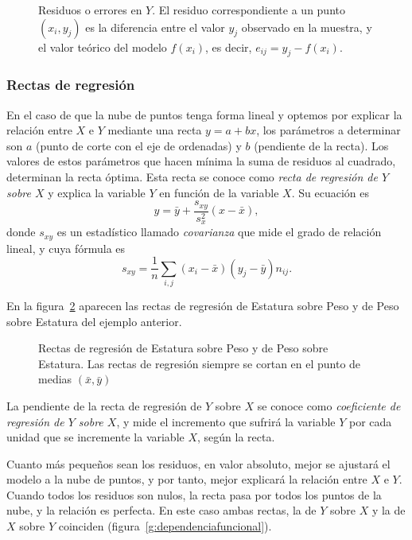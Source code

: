 \begin{figure}[h!]
\centering
\scalebox{0.8}{}
\caption{Residuos o errores en $Y$. El residuo correspondiente a un punto $(x_i,y_j)$ es la diferencia entre el valor
$y_j$ observado en la muestra, y el valor teórico del modelo $f(x_i)$, es decir, $e_{ij}=y_j-f(x_i)$.}
\label{g:residuos}
\end{figure}

\subsubsection{Rectas de regresión}
En el caso de que la nube de puntos tenga forma lineal y optemos por explicar la relación entre $X$ e $Y$ mediante una
recta $y=a+bx$, los parámetros a determinar son $a$ (punto de corte con el eje de ordenadas) y $b$ (pendiente de la
recta).
Los valores de estos parámetros que hacen mínima la suma de residuos al cuadrado, determinan la recta óptima. Esta recta
se conoce como \emph{recta de regresión de $Y$ sobre $X$} y explica la variable $Y$ en función de la variable
$X$. Su ecuación es
\[ y= \bar{y}+\frac{s_{xy}}{s_x^2}(x-\bar{x}),\]
donde $s_{xy}$ es un estadístico llamado \emph{covarianza} que mide el grado de relación lineal, y cuya fórmula es
\[s_{xy}=\frac{1}{n}\sum_{i,j} (x_i-\bar{x}) (y_j-\bar{y}) n_{ij}.\]

\begin{ejemplo}
En la figura~\ref{g:rectas-estatura-peso} aparecen las rectas de regresión de Estatura sobre Peso y de Peso sobre Estatura del ejemplo anterior.

\begin{figure}[h!]
\centering
\scalebox{0.8}{}
\caption{Rectas de regresión de Estatura sobre Peso y de Peso sobre Estatura. 
Las rectas de regresión siempre se cortan en el punto de medias $(\bar x, \bar y)$}
\label{g:rectas-estatura-peso}
\end{figure}
\end{ejemplo}

La pendiente de la recta de regresión de $Y$ sobre $X$ se conoce como \emph{coeficiente de regresión de $Y$ sobre $X$},
y mide el incremento que sufrirá la variable $Y$ por cada unidad que se incremente la variable $X$, según la recta.

Cuanto más pequeños sean los residuos, en valor absoluto, mejor se ajustará el modelo a la nube de puntos, y por tanto,
mejor explicará la relación entre $X$ e $Y$.
Cuando todos los residuos son nulos, la recta pasa por todos los puntos de la nube, y la relación es perfecta.
En este caso ambas rectas, la de $Y$ sobre $X$ y la de $X$ sobre $Y$ coinciden (figura~\ref{g:dependenciafuncional}).

